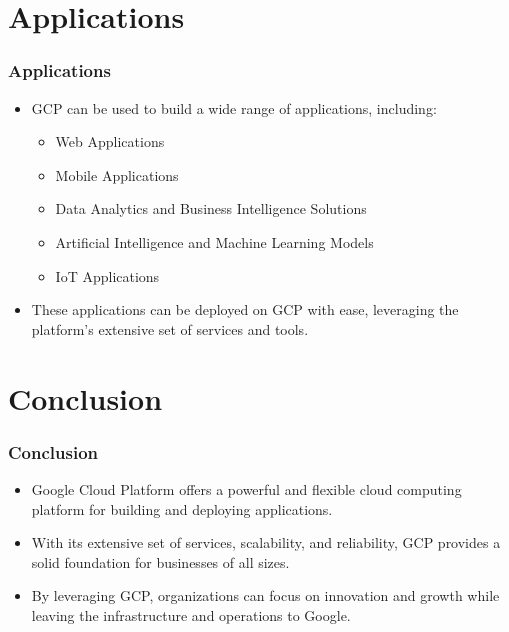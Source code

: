 \section{Applications}

\begin{frame}[fragile]\frametitle{Applications}
  \begin{itemize}
    \item GCP can be used to build a wide range of applications, including:
      \begin{itemize}
        \item Web Applications
        \item Mobile Applications
        \item Data Analytics and Business Intelligence Solutions
        \item Artificial Intelligence and Machine Learning Models
        \item IoT Applications
      \end{itemize}
    \item These applications can be deployed on GCP with ease, leveraging the platform's extensive set of services and tools.
  \end{itemize}
\end{frame}

\section{Conclusion}

\begin{frame}[fragile]\frametitle{Conclusion}
  \begin{itemize}
    \item Google Cloud Platform offers a powerful and flexible cloud computing platform for building and deploying applications.
    \item With its extensive set of services, scalability, and reliability, GCP provides a solid foundation for businesses of all sizes.
    \item By leveraging GCP, organizations can focus on innovation and growth while leaving the infrastructure and operations to Google.
  \end{itemize}
\end{frame}

